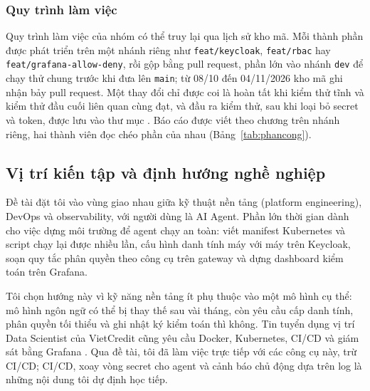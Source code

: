 \subsubsection{Quy trình làm việc}

Quy trình làm việc của nhóm có thể truy lại qua lịch sử kho mã. Mỗi thành phần được phát triển trên một nhánh riêng như \texttt{feat/keycloak}, \texttt{feat/rbac} hay \texttt{feat/grafana-allow-deny}, rồi gộp bằng pull request, phần lớn vào nhánh \texttt{dev} để chạy thử chung trước khi đưa lên \texttt{main}; từ 08/10 đến 04/11/2026 kho mã ghi nhận bảy pull request. Một thay đổi chỉ được coi là hoàn tất khi kiểm thử tĩnh và kiểm thử đầu cuối liên quan cùng đạt, và đầu ra kiểm thử, sau khi loại bỏ secret và token, được lưu vào thư mục . Báo cáo được viết theo chương trên nhánh riêng, hai thành viên đọc chéo phần của nhau (Bảng~\ref{tab:phancong}).

\subsection{Vị trí kiến tập và định hướng nghề nghiệp}

Đề tài đặt tôi vào vùng giao nhau giữa kỹ thuật nền tảng (platform engineering), DevOps và observability, với người dùng là AI Agent. Phần lớn thời gian dành cho việc dựng môi trường để agent chạy an toàn: viết manifest Kubernetes và script chạy lại được nhiều lần, cấu hình danh tính máy với máy trên Keycloak, soạn quy tắc phân quyền theo công cụ trên gateway và dựng dashboard kiểm toán trên Grafana.

Tôi chọn hướng này vì kỹ năng nền tảng ít phụ thuộc vào một mô hình cụ thể: mô hình ngôn ngữ có thể bị thay thế sau vài tháng, còn yêu cầu cấp danh tính, phân quyền tối thiểu và ghi nhật ký kiểm toán thì không. Tin tuyển dụng vị trí Data Scientist của VietCredit cũng yêu cầu Docker, Kubernetes, CI/CD và giám sát bằng Grafana \parencite{vietcredit_tuyendung_ds}. Qua đề tài, tôi đã làm việc trực tiếp với các công cụ này, trừ CI/CD; CI/CD, xoay vòng secret cho agent và cảnh báo chủ động dựa trên log là những nội dung tôi dự định học tiếp.
